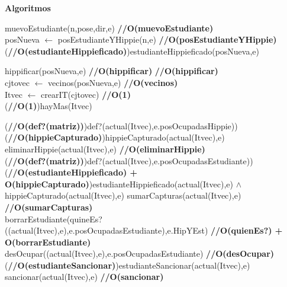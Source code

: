 \documentclass[a4paper,10pt]{article}
\newenvironment{Algoritmos}{%
  \vspace*{2ex}%
  \noindent\textbf{\Large Algoritmos}%
  \vspace*{2ex}%
}{}
\begin{document}
\begin{Algoritmos}
\begin{algorithm}[H]
{{   }
    {
     muevoEstudiante(n,pose,dir,e) \hfill \textbf{//O(muevoEstudiante)}\\
     posNueva $\leftarrow$ posEstudianteYHippie(n,e) \hfill \textbf{//O(posEstudianteYHippie)}\\
     \eIf(\hfill \textbf{//O(estudianteHippieficado)}){estudianteHippieficado(posNueva,e)}
     {
       hippificar(posNueva,e) \hfill \textbf{//O(hippificar)} \hfill \textbf{//O(hippificar)}\\
       cjtovec $\leftarrow$ vecinos(posNueva,e) \hfill \textbf{//O(vecinos)}\\
       Itvec $\leftarrow$ crearIT(cjtovec) \hfill \textbf{//O(1)}\\
       \While(\hfill \textbf{//O(1)}){hayMas(Itvec)}
       {
         \If(\hfill \textbf{//O(def?(matriz))}){def?(actual(Itvec),e.posOcupadasHippie))}
         {
           \If(\hfill \textbf{//O(hippieCapturado)}){hippieCapturado(actual(Itvec),e)}
           {
             eliminarHippie(actual(Itvec),e) \hfill \textbf{//O(eliminarHippie)}\\
           }
         }
         \If(\hfill \textbf{//O(def?(matriz))}){def?(actual(Itvec),e.posOcupadasEstudiante))}
         {
           \If(\hfill \textbf{//O(estudianteHippieficado) + O(hippieCapturado)}){estudianteHippieficado(actual(Itvec),e) $\land$ hippieCapturado(actual(Itvec),e)}
           {
             sumarCapturas(actual(Itvec),e) \hfill \textbf{//O(sumarCapturas)}\\
             borrarEstudiante(quineEs?((actual(Itvec),e),e.posOcupadasEstudiante),e.HipYEst) \hfill \textbf{//O(quienEs?) + O(borrarEstudiante)}\\
             desOcupar((actual(Itvec),e),e.posOcupadasEstudiante) \hfill \textbf{//O(desOcupar)}\\
           }
           \If(\hfill \textbf{//O(estudianteSancionar)}){estudianteSancionar(actual(Itvec),e)}
           {
             sancionar(actual(Itvec),e) \hfill \textbf{//O(sancionar)}\\
           }
         }
         
}}}}
\end{algorithm}
\end{Algoritmos}
\end{document}
